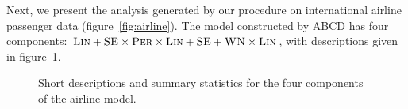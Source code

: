 \documentclass[letterpaper]{article}
\newcommand{\procedurename}{ABCD}
\begin{document}
Next, we present the analysis generated by our procedure on international airline passenger data (figure~\ref{fig:airline}).
The model constructed by \procedurename{} has four components: ${\textsc{Lin}} + {\textsc{SE}} \times {\textsc{Per}} \times {\textsc{Lin}} + {\textsc{SE}} + {\textsc{WN}} \times {\textsc{Lin}}$, with descriptions given in figure~\ref{fig:exec-airline}.
%
\begin{figure}[h]
\centering
{}
\caption{
Short descriptions and summary statistics for the four components of the airline model.}
\label{fig:exec-airline}
\end{figure}
\end{document}
